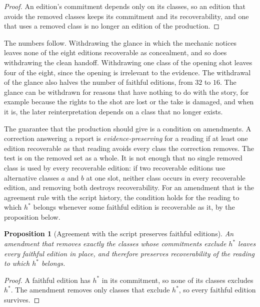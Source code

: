 \documentclass[11pt,twoside,openright]{book}
\theoremstyle{plain}
\newtheorem{proposition}[theorem]{Proposition}
\theoremstyle{definition}
\theoremstyle{remark}
\begin{document}
\begin{proof}
An edition's commitment depends only on its classes, so an edition that avoids the removed classes keeps its commitment and its recoverability, and one that uses a removed class is no longer an edition of the production.
\end{proof}

The numbers follow. Withdrawing the glance in which the mechanic notices leaves none of the eight editions recoverable as concealment, and so does withdrawing the clean handoff. Withdrawing one class of the opening shot leaves four of the eight, since the opening is irrelevant to the evidence. The withdrawal of the glance also halves the number of faithful editions, from $32$ to $16$. The glance can be withdrawn for reasons that have nothing to do with the story, for example because the rights to the shot are lost or the take is damaged, and when it is, the later reinterpretation depends on a class that no longer exists.

The guarantee that the production should give is a condition on amendments. A correction answering a report is \emph{evidence-preserving} for a reading if at least one edition recoverable as that reading avoids every class the correction removes. The test is on the removed set as a whole. It is not enough that no single removed class is used by every recoverable edition: if two recoverable editions use alternative classes $a$ and $b$ at one slot, neither class occurs in every recoverable edition, and removing both destroys recoverability. For an amendment that is the agreement rule with the script history, the condition holds for the reading to which $h^\ast$ belongs whenever some faithful edition is recoverable as it, by the proposition below.

\begin{proposition}[Agreement with the script preserves faithful editions]\label{prop:agree}
An amendment that removes exactly the classes whose commitments exclude $h^\ast$ leaves every faithful edition in place, and therefore preserves recoverability of the reading to which $h^\ast$ belongs.
\end{proposition}

\begin{proof}
A faithful edition has $h^\ast$ in its commitment, so none of its classes excludes $h^\ast$. The amendment removes only classes that exclude $h^\ast$, so every faithful edition survives.
\end{proof}
\end{document}
